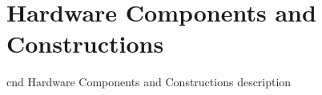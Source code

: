 \section{Hardware Components and Constructions}

cnd Hardware Components and Constructions description


